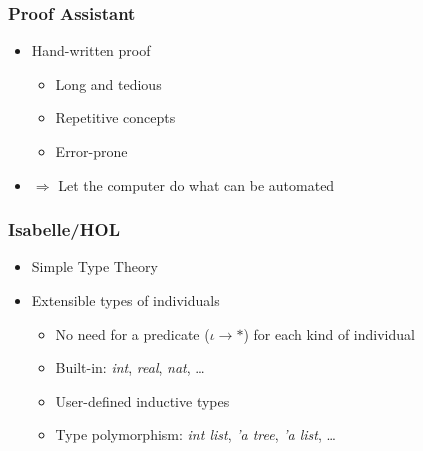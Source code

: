 \documentclass{beamer}
\begin{document}
  \begin{frame}
    \frametitle{Proof Assistant}
    \begin{itemize}
      \item<1-> Hand-written proof
      \begin{itemize}
        \item Long and tedious
        \item Repetitive concepts
        \item Error-prone
      \end{itemize}
      \item<2-> $\Rightarrow$ Let the computer do what can be automated
    \end{itemize}

  \end{frame}

  \begin{frame}
    \frametitle{Isabelle/HOL}
    \begin{itemize}
      \item<1-> Simple Type Theory
      \item<2-> Extensible types of individuals
      \begin{itemize}
        \item No need for a predicate ($\iota \rightarrow *$) for each kind of individual
        \item Built-in: \textit{int}, \textit{real}, \textit{nat}, \ldots
        \item User-defined inductive types
        \item Type polymorphism: \textit{int list}, \textit{'a tree}, \textit{'a list}, \ldots
      \end{itemize}
    \end{itemize}
  \end{frame}
\end{document}
